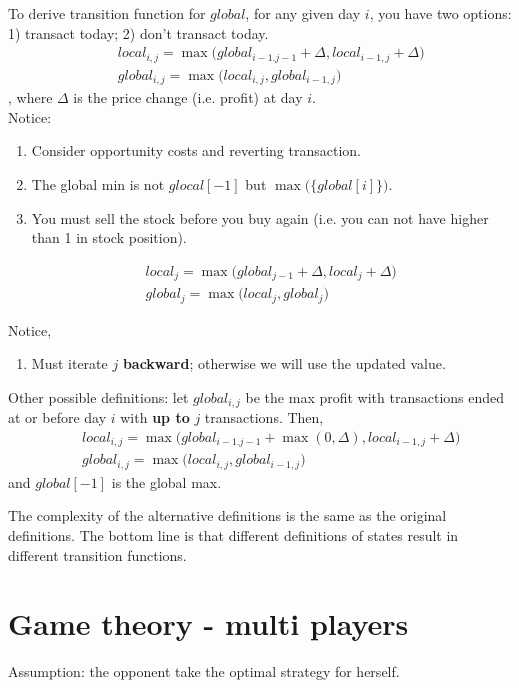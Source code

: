 {To derive transition function for $global$, for any given day $i$, you have two options: 1) transact today; 2) don't transact today. 
\begin{eqnarray*}
&& local_{i,j} = \max\Big(global_{i-1.j-1}+\Delta, local_{i-1,j}+\Delta\Big) \nonumber \\
&& global_{i,j} = \max\Big(local_{i, j}, global_{i-1,j}\Big)
\end{eqnarray*}
, where $\Delta$ is the price change (i.e. profit) at day $i$.\\
Notice:
\begin{enumerate}
\item Consider opportunity costs and reverting transaction.
\item The global min is not $glocal[-1]$ but $\max\big(\{global[i]\}\big)$.
\item You must sell the stock before you buy again (i.e. you can not have higher than 1 in stock position). 
\end{enumerate}

\begin{eqnarray*}
&& local_{j} = \max\Big(global_{j-1} + \Delta, local_{j}+\Delta\Big)
\nonumber \\
&& global_{j} = \max\Big(local_{j}, global_{j}\Big)
\end{eqnarray*}

Notice,
\begin{enumerate}
\item Must iterate $j$ \textbf{backward}; otherwise we will use the updated value. 
\end{enumerate}

Other possible definitions: let $global_{i, j}$ be the max profit
with transactions ended at or before day $i$ with \textbf{up to} $j$ transactions. Then, 
\begin{eqnarray*}
&& local_{i,j} = \max\Big(global_{i-1.j-1} + \max(0, \Delta), local_{i-1,j}+\Delta\Big)
\nonumber \\
&& global_{i,j} = \max\Big(local_{i, j}, global_{i-1,j}\Big)
\end{eqnarray*}
and $global[-1]$ is the global max. 

The complexity of the alternative definitions is the same as the original definitions. The bottom line is that different definitions of states result in different transition functions.

\section{Game theory - multi players}
Assumption: the opponent take the optimal strategy for herself. 

}
